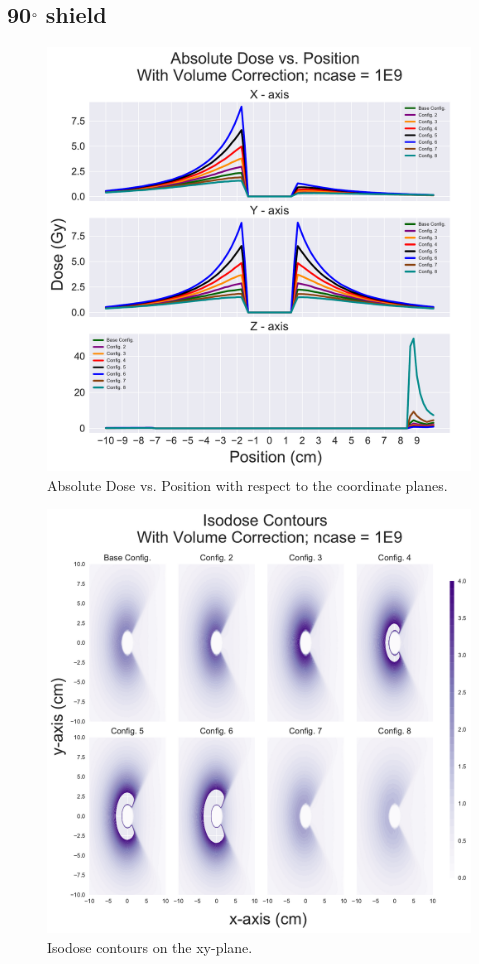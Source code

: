 \documentclass[12pt]{article}
\begin{document}
\FloatBarrier

\subsection{90$\degree$ shield}

\begin{figure}[!ht]
	\centering
	\includegraphics[scale=0.6]{dosage_comparison_90Shield}
	\caption{Absolute Dose vs. Position with respect to the coordinate planes.}
\end{figure}

\begin{figure}[!ht]
	\centering
	\includegraphics[scale=0.6]{xy_isodose_profiles_90Shield}
	\caption{Isodose contours on the xy-plane.}
\end{figure}
\end{document}
